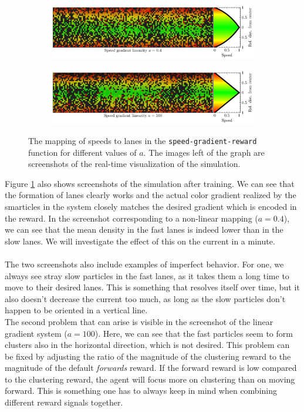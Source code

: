 \begin{figure}[H]
\centering
\begin{subfigure}{\textwidth}
    \centering
    \includegraphics[width=\textwidth]{speed_gradient_0.4}
\end{subfigure}
\begin{subfigure}{\textwidth}
    \centering
    \includegraphics[width=\textwidth]{speed_gradient_100}
\end{subfigure}
\caption{The mapping of speeds to lanes in the \texttt{speed-gradient-reward} function for different values of $a$. The images left of the graph are screenshots of the real-time visualization of the simulation.}
\label{fig:speed_gradient}
\end{figure}
Figure \ref{fig:speed_gradient} also shows screenshots of the simulation after training. We can see that the formation of lanes clearly works and the actual color gradient realized by the smarticles in the system closely matches the desired gradient which is encoded in the reward. In the screenshot corresponding to a non-linear mapping ($a=0.4$), we can see that the mean density in the fast lanes is indeed lower than in the slow lanes. We will investigate the effect of this on the current in a minute. 
\\
\\
The two screenshots also include examples of imperfect behavior. For one, we always see stray slow particles in the fast lanes, as it takes them a long time to move to their desired lanes. This is something that resolves itself over time, but it also doesn't decrease the current too much, as long as the slow particles don't happen to be oriented in a vertical line. 
\\
The second problem that can arise is visible in the screenshot of the linear gradient system ($a=100$). Here, we can see that the fast particles seem to form clusters also in the horizontal direction, which is not desired. This problem can be fixed by adjusting the ratio of the magnitude of the clustering reward to the magnitude of the default \textit{forwards} reward. If the forward reward is low compared to the clustering reward, the agent will focus more on clustering than on moving forward. This is something one has to always keep in mind when combining different reward signals together.
